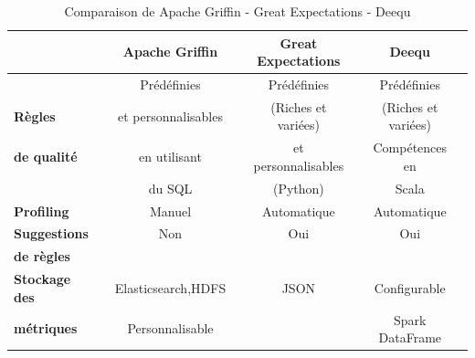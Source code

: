 \begin{table}[H]
\caption{Comparaison de Apache Griffin - Great Expectations - Deequ}
\footnotesize
\vspace{0.5cm}
\begin{tabular}{ll|cl|cl|cl}%
\toprule 
                          && \textbf{Apache Griffin}     && \textbf{Great Expectations}     && \textbf{Deequ}               \\%
\midrule

                          && Pr\'ed\'efinies     && Pr\'ed\'efinies         && Pr\'ed\'efinies        \\%
\textbf{R\`egles}                  && et personnalisables  && (Riches et vari\'ees)  && (Riches et vari\'ees)         \\%
\textbf{de qualit\'e}              &&  en utilisant      &&  et personnalisables     && Comp\'etences en          \\%
                          &&  du SQL            &&    (Python)            && Scala \\%
\hline 
\textbf{Profiling}                 && Manuel             && Automatique            && Automatique               \\%

\hline
\textbf{Suggestions}               && Non                && Oui                    && Oui                         \\%
\textbf{de r\`egles }              &&                    &&                        &&                              \\%

\hline
\textbf{Stockage des}              && Elasticsearch,HDFS && JSON                   && Configurable                  \\%
\textbf{m\'etriques}               && Personnalisable    &&                        && Spark DataFrame                               \\%


\end{tabular}
\end{table}

